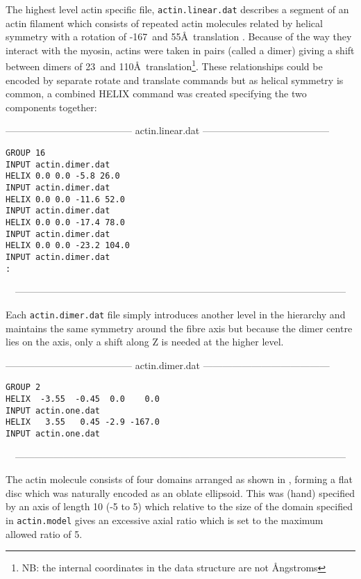 The highest level actin specific file, {\tt actin.linear.dat} describes a segment
of an actin filament which consists of repeated actin molecules related by helical
symmetry with a rotation of -167\degre\ and 55\AA\ translation \cite{HolmesKC09}.  Because of the way
they interact with the myosin, actins were taken in pairs (called a dimer) giving a
shift between dimers of 23\degre\ and 110\AA\ translation\footnote{
NB: the internal coordinates in the data structure are not \AA ngstroms}.  
These relationships could be encoded by separate 
rotate and translate commands but as helical symmetry is common, a combined HELIX
command was created specifying the two components together:

\begin{singlespace}
---------------------------------------
actin.linear.dat
---------------------------------------
\begin{verbatim}
GROUP 16
INPUT actin.dimer.dat
HELIX 0.0 0.0 -5.8 26.0
INPUT actin.dimer.dat
HELIX 0.0 0.0 -11.6 52.0
INPUT actin.dimer.dat
HELIX 0.0 0.0 -17.4 78.0
INPUT actin.dimer.dat
HELIX 0.0 0.0 -23.2 104.0
INPUT actin.dimer.dat
:
\end{verbatim}
\ \ ------------------------------------------------------------------------------------------------------
\end{singlespace}

Each {\tt actin.dimer.dat} file simply introduces another level in the hierarchy
and maintains the same symmetry around the fibre axis but because the dimer centre lies on the
axis, only a shift along Z is needed at the higher level.

\begin{singlespace}
---------------------------------------
actin.dimer.dat
---------------------------------------
\begin{verbatim}
GROUP 2
HELIX  -3.55  -0.45  0.0    0.0
INPUT actin.one.dat
HELIX   3.55   0.45 -2.9 -167.0
INPUT actin.one.dat
\end{verbatim}
\ \ ------------------------------------------------------------------------------------------------------
\end{singlespace}

The actin molecule consists of four domains arranged as shown in ,
forming a flat disc which was naturally encoded
as an oblate ellipsoid.   This was (hand) specified by an axis of length 10 (-5 to 5) which
relative to the size of the domain specified in {\tt actin.model} gives an excessive axial ratio 
which is set to the maximum allowed ratio of 5.\\

